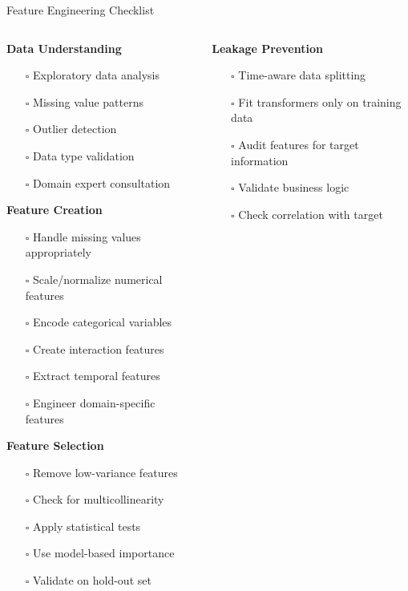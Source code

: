 \documentclass[aspectratio=169,11pt]{beamer}
\begin{document}
\begin{frame}{Feature Engineering Checklist}
\begin{columns}
\begin{column}{0.5\textwidth}
\textbf{Data Understanding}
\begin{itemize}
\item[$\square$] Exploratory data analysis
\item[$\square$] Missing value patterns
\item[$\square$] Outlier detection
\item[$\square$] Data type validation
\item[$\square$] Domain expert consultation
\end{itemize}

\vspace{0.3cm}
\textbf{Feature Creation}
\begin{itemize}
\item[$\square$] Handle missing values appropriately
\item[$\square$] Scale/normalize numerical features
\item[$\square$] Encode categorical variables
\item[$\square$] Create interaction features
\item[$\square$] Extract temporal features
\item[$\square$] Engineer domain-specific features
\end{itemize}

\vspace{0.3cm}
\textbf{Feature Selection}
\begin{itemize}
\item[$\square$] Remove low-variance features
\item[$\square$] Check for multicollinearity
\item[$\square$] Apply statistical tests
\item[$\square$] Use model-based importance
\item[$\square$] Validate on hold-out set
\end{itemize}
\end{column}
\begin{column}{0.5\textwidth}
\textbf{Leakage Prevention}
\begin{itemize}
\item[$\square$] Time-aware data splitting
\item[$\square$] Fit transformers only on training data
\item[$\square$] Audit features for target information
\item[$\square$] Validate business logic
\item[$\square$] Check correlation with target
\end{itemize}


\end{column}
\end{columns}
\end{frame}
\end{document}
